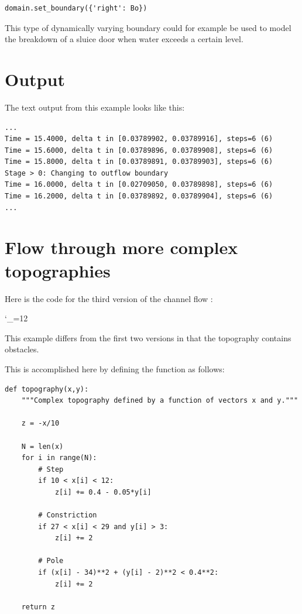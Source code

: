 \documentclass{manual}
\newcommand{\verbatiminputB}[1]{%
\endgroup}
\def\verbatiminputunderscore{\begingroup 
\catcode`\_=12
\verbatiminputB}
\begin{document}
\begin{verbatim}
domain.set_boundary({'right': Bo})
\end{verbatim}

This type of dynamically varying boundary could for example be
used to model the breakdown of a sluice door when water exceeds a certain level.

\section{Output}

The text output from this example looks like this:

\begin{verbatim}
...
Time = 15.4000, delta t in [0.03789902, 0.03789916], steps=6 (6)
Time = 15.6000, delta t in [0.03789896, 0.03789908], steps=6 (6)
Time = 15.8000, delta t in [0.03789891, 0.03789903], steps=6 (6)
Stage > 0: Changing to outflow boundary
Time = 16.0000, delta t in [0.02709050, 0.03789898], steps=6 (6)
Time = 16.2000, delta t in [0.03789892, 0.03789904], steps=6 (6)
...
\end{verbatim}

\section{Flow through more complex topographies}

Here is the code for the third version of the channel flow :

\verbatiminputunderscore{../../anuga_core/examples/channel3.py}

This example differs from the first two versions in that the topography
contains obstacles.

This is accomplished here by defining the function  as follows:

\begin{verbatim}
def topography(x,y):
    """Complex topography defined by a function of vectors x and y."""

    z = -x/10

    N = len(x)
    for i in range(N):
        # Step
        if 10 < x[i] < 12:
            z[i] += 0.4 - 0.05*y[i]

        # Constriction
        if 27 < x[i] < 29 and y[i] > 3:
            z[i] += 2

        # Pole
        if (x[i] - 34)**2 + (y[i] - 2)**2 < 0.4**2:
            z[i] += 2

    return z
\end{verbatim}
\end{document}
